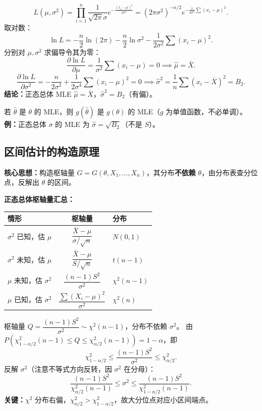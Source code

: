 \documentclass[11pt,a4paper]{article}
\begin{document}
\begin{derivation}
\[
L(\mu,\sigma^2) = \prod_{i=1}^n \frac{1}{\sqrt{2\pi}\sigma}e^{-\frac{(x_i-\mu)^2}{2\sigma^2}} = (2\pi\sigma^2)^{-n/2} e^{-\frac{1}{2\sigma^2}\sum(x_i-\mu)^2}.
\]
取对数：
\[
\ln L = -\frac{n}{2}\ln(2\pi) - \frac{n}{2}\ln\sigma^2 - \frac{1}{2\sigma^2}\sum(x_i-\mu)^2.
\]
分别对 $\mu,\sigma^2$ 求偏导令其为零：
\[
\frac{\partial\ln L}{\partial\mu} = \frac{1}{\sigma^2}\sum(x_i-\mu)=0 \implies \hat\mu=\bar X.
\]
\[
\frac{\partial\ln L}{\partial\sigma^2} = -\frac{n}{2\sigma^2}+\frac{1}{2\sigma^4}\sum(x_i-\mu)^2=0 \implies \hat\sigma^2=\frac{1}{n}\sum(x_i-\bar X)^2=B_2.
\]
\textbf{结论：}正态总体 MLE $\hat\mu=\bar X$，$\hat\sigma^2=B_2$（有偏）。
\end{derivation}

\begin{keypoint}
若 $\hat\theta$ 是 $\theta$ 的 MLE，则 $g(\hat\theta)$ 是 $g(\theta)$ 的 MLE（$g$ 为单值函数，不必单调）。
\textbf{例：}正态总体 $\sigma$ 的 MLE 为 $\hat\sigma=\sqrt{B_2}$（不是 $S$）。
\end{keypoint}

\subsection{区间估计的构造原理}

\begin{variation}
\textbf{核心思想：}构造枢轴量 $G=G(\theta, X_1,\dots,X_n)$，其分布\textbf{不依赖} $\theta$，由分布表查分位点，反解出 $\theta$ 的区间。

\textbf{正态总体枢轴量汇总：}
\begin{center}
\begin{tabular}{lcl}
\toprule
情形 & 枢轴量 & 分布 \\
\midrule
$\sigma^2$ 已知，估 $\mu$ & $\dfrac{\bar X-\mu}{\sigma/\sqrt n}$ & $N(0,1)$ \\
$\sigma^2$ 未知，估 $\mu$ & $\dfrac{\bar X-\mu}{S/\sqrt n}$ & $t(n-1)$ \\
$\mu$ 未知，估 $\sigma^2$ & $\dfrac{(n-1)S^2}{\sigma^2}$ & $\chi^2(n-1)$ \\
$\mu$ 已知，估 $\sigma^2$ & $\dfrac{\sum(X_i-\mu)^2}{\sigma^2}$ & $\chi^2(n)$ \\
\bottomrule
\end{tabular}
\end{center}
\end{variation}

\begin{derivation}
枢轴量 $Q=\dfrac{(n-1)S^2}{\sigma^2}\sim\chi^2(n-1)$，分布不依赖 $\sigma^2$。
由 $P\!\left(\chi^2_{1-\alpha/2}(n-1)\leq Q\leq \chi^2_{\alpha/2}(n-1)\right)=1-\alpha$，即
\[
\chi^2_{1-\alpha/2} \leq \frac{(n-1)S^2}{\sigma^2} \leq \chi^2_{\alpha/2}.
\]
反解 $\sigma^2$（注意不等式方向反转，因 $\sigma^2$ 在分母）：
\[
\frac{(n-1)S^2}{\chi^2_{\alpha/2}(n-1)} \leq \sigma^2 \leq \frac{(n-1)S^2}{\chi^2_{1-\alpha/2}(n-1)}.
\]
\textbf{关键：}$\chi^2$ 分布右偏，$\chi^2_{\alpha/2}>\chi^2_{1-\alpha/2}$，故大分位点对应小区间端点。
\end{derivation}
\end{document}
